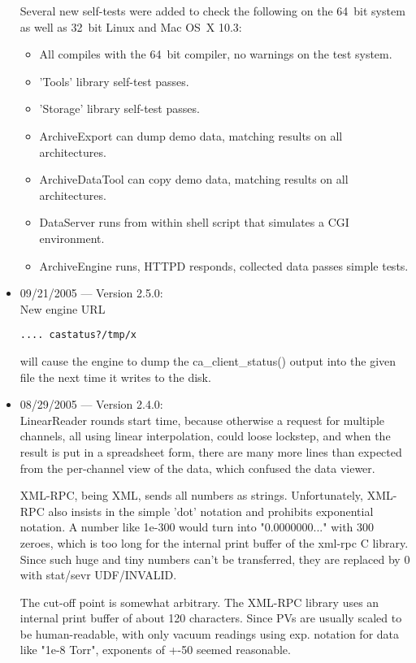 \begin{itemize}
Several new self-tests were added to check
the following on the 64~bit system as well
as 32~bit Linux and Mac OS~X 10.3:
\begin{itemize}
\item All compiles with the 64~bit compiler, no warnings on the test system.
\item 'Tools' library self-test passes.
\item 'Storage' library self-test passes.
\item ArchiveExport can dump demo data,
      matching results on all architectures.
\item ArchiveDataTool can copy demo data,
      matching results on all architectures.
\item DataServer runs from within shell script
      that simulates a CGI environment.
\item ArchiveEngine runs, HTTPD responds,
      collected data passes simple tests.
\end{itemize}

\item 09/21/2005 --- Version 2.5.0:\\
New engine URL
\begin{verbatim}
.... castatus?/tmp/x
\end{verbatim}
will cause the engine to dump the ca\_client\_status() output
into the given file the next time it writes to the disk.

\item 08/29/2005 --- Version 2.4.0:\\
LinearReader rounds start time,
because otherwise a request for multiple channels,
all using linear interpolation, could loose
lockstep, and when the result is put in a spreadsheet
form, there are many more lines than expected
from the per-channel view of the data,
which confused the data viewer.

XML-RPC, being XML, sends all numbers as strings.
Unfortunately, XML-RPC also insists in the simple 'dot'
notation and prohibits exponential notation.
A number like 1e-300 would turn into
"0.0000000..." with 300 zeroes,
which is too long for the internal print buffer of
the xml-rpc C library.
Since such huge and tiny numbers can't be transferred,
they are replaced by 0 with stat/sevr UDF/INVALID.

The cut-off point is somewhat arbitrary.
The XML-RPC library uses an internal print buffer
of about 120 characters.
Since PVs are usually scaled to be human-readable,
with only vacuum readings using exp. notation for
data like "1e-8 Torr", exponents of +-50 seemed
reasonable.


\end{itemize}
